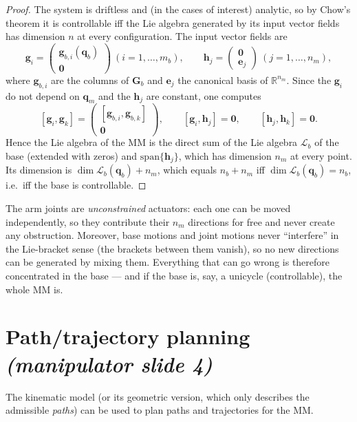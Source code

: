 \documentclass[11pt,a4paper]{article}
\newcommand{\qbase}{\bm{q}_b}
\newcommand{\qarm}{\bm{q}_m}
\newcommand{\Gbase}{\bm{G}_b}
\newcommand{\R}{\mathbb{R}}
\theoremstyle{plain}
\theoremstyle{definition}
\theoremstyle{remark}
\begin{document}
\begin{proof}
The system is driftless and (in the cases of interest) analytic, so by Chow's theorem it is controllable iff the Lie algebra generated by its input vector fields has dimension $n$ at every configuration. The input vector fields are
\[
\bm g_i=\begin{pmatrix}\bm g_{b,i}(\qbase)\\ \bm 0\end{pmatrix}\ (i=1,\dots,m_b),\qquad
\bm h_j=\begin{pmatrix}\bm 0\\ \bm e_j\end{pmatrix}\ (j=1,\dots,n_m),
\]
where $\bm g_{b,i}$ are the columns of $\Gbase$ and $\bm e_j$ the canonical basis of $\R^{n_m}$. Since the $\bm g_i$ do not depend on $\qarm$ and the $\bm h_j$ are constant, one computes
\[
[\bm g_i,\bm g_k]=\begin{pmatrix}[\bm g_{b,i},\bm g_{b,k}]\\ \bm 0\end{pmatrix},\qquad
[\bm g_i,\bm h_j]=\bm 0,\qquad [\bm h_j,\bm h_k]=\bm 0 .
\]
Hence the Lie algebra of the MM is the direct sum of the Lie algebra $\mathcal L_b$ of the base (extended with zeros) and $\mathrm{span}\{\bm h_j\}$, which has dimension $n_m$ at every point. Its dimension is $\dim\mathcal L_b(\qbase)+n_m$, which equals $n_b+n_m$ iff $\dim\mathcal L_b(\qbase)=n_b$, i.e.\ iff the base is controllable.
\end{proof}

\begin{intuition}
The arm joints are \emph{unconstrained} actuators: each one can be moved independently, so they contribute their $n_m$ directions for free and never create any obstruction. Moreover, base motions and joint motions never ``interfere'' in the Lie-bracket sense (the brackets between them vanish), so no new directions can be generated by mixing them. Everything that can go wrong is therefore concentrated in the base --- and if the base is, say, a unicycle (controllable), the whole MM is.
\end{intuition}

\section{Path/trajectory planning \emph{(manipulator slide 4)}}

The kinematic model (or its geometric version, which only describes the admissible \emph{paths}) can be used to plan paths and trajectories for the MM.
\end{document}
